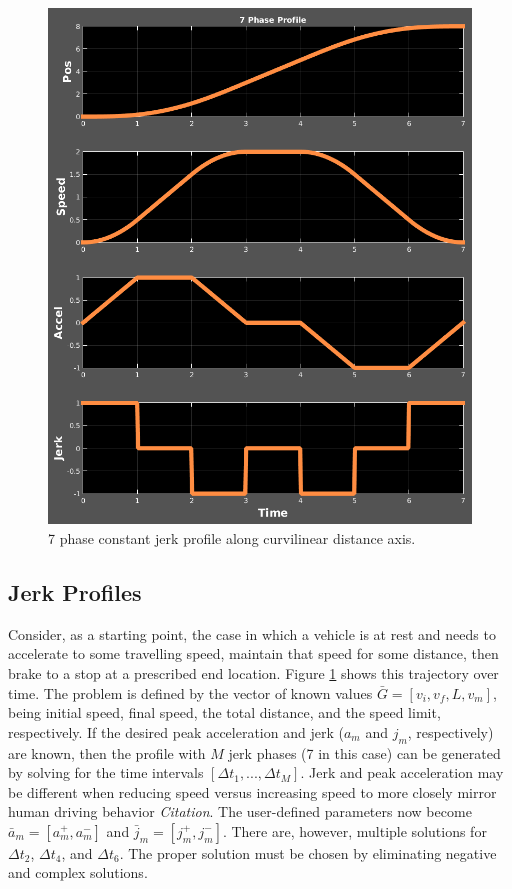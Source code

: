 \documentclass[letterpaper, 10 pt, conference]{ieeeconf}  %
\begin{document}
\begin{figure}[thpb]
  \centering
  \includegraphics[width=1.0\columnwidth]{graphics/7phaseprofile.png}
  \caption{7 phase constant jerk profile along curvilinear distance axis.}
  \label{fig:7phaseprofile}
\end{figure}

\subsection{Jerk Profiles}
\label{sec:jerkprofiles}

Consider, as a starting point, the case in which a vehicle is at rest and needs to accelerate to some travelling speed, maintain that speed for some distance, then brake to a stop at a prescribed end location.
Figure \ref{fig:7phaseprofile} shows this trajectory over time.
The problem is defined by the vector of known values $\bar{G}  = [v_i, v_f, L, v_m]$, being initial speed, final speed, the total distance, and the speed limit, respectively.
If the desired peak acceleration and jerk ($a_m$ and $j_m$, respectively) are known, then the profile with $M$ jerk phases (7 in this case) can be generated by solving for the time intervals $[\Delta t_1, ..., \Delta t_M]$.
Jerk and peak acceleration may be different when reducing speed versus increasing speed to more closely mirror human driving behavior \emph{Citation}.
The user-defined parameters now become $\bar{a}_m = [a^+_m , a^-_m]$ and $\bar{j}_m = [j^+_m , j^-_m]$.
There are, however, multiple solutions for $\Delta t_2$, $\Delta t_4$, and $\Delta t_6$.
The proper solution must be chosen by eliminating negative and complex solutions.
\end{document}

